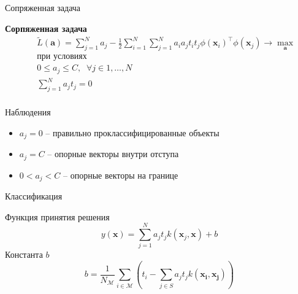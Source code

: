 \documentclass[aspectratio=169]{beamer}
\begin{document}
\begin{frame}{Сопряженная задача}

\begin{framed}
{\bf Сорпяженная задача}
\begin{eqnarray*}
&& \tilde{L}(\mathbf{a}) = \sum_{j=1}^N a_j - \frac{1}{2} \sum_{i=1}^N \sum_{j=1}^N a_i a_j t_i t_j \phi(\mathbf{x}_i)^\top \phi(\mathbf{x}_j) \rightarrow \max_{\mathbf{a}} \\
&& \text{при условиях} \\
&& 0 \leq a_j \leq C, \;\; \forall j \in 1,\ldots,N \\
&& \sum_{j=1}^N a_j t_j = 0\\
\end{eqnarray*}
\end{framed}

Наблюдения
\begin{itemize}
\item $a_j = 0$ -- правильно проклассифицированные объекты
\item $a_j = C$ -- опорные векторы внутри отступа 
\item $0 < a_j < C$ -- опорные векторы на границе
\end{itemize}

\end{frame}

\begin{frame}{Классификация}

Функция принятия решения
\[
y(\mathbf{x}) = \sum_{j=1}^N a_j t_j k(\mathbf{x}_j, \mathbf{x}) + b
\]
Константа $b$
\[
b = \frac{1}{N_\mathcal{M}} \sum_{i \in \mathcal{M}} \left( t_i - \sum_{j \in S} a_j t_j k(\mathbf{x_i}, \mathbf{x_j})\right)
\]

\end{frame}
\end{document}
